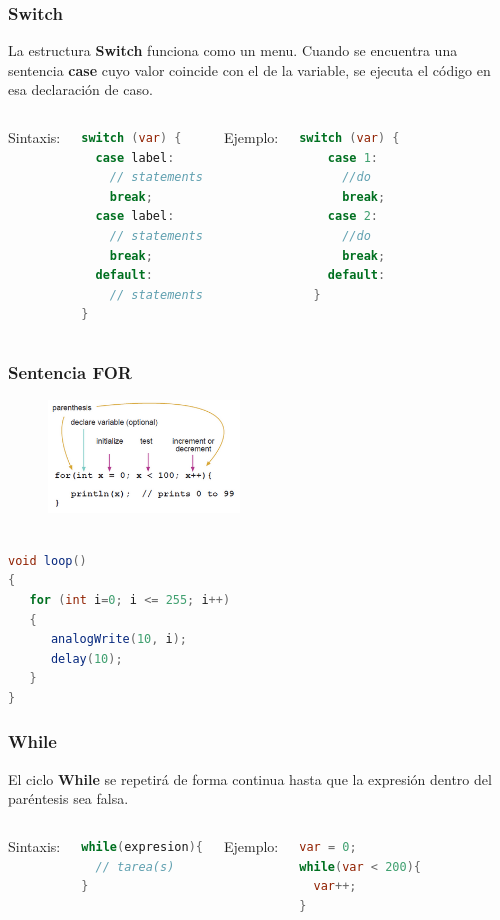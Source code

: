 \documentclass{beamer}
\begin{document}
\begin{frame}[fragile]
\frametitle{Switch}
La estructura \textbf{Switch} funciona como un menu. Cuando se encuentra una sentencia \textbf{case} cuyo valor coincide con el de la variable, se ejecuta el código en esa declaración de caso.
\vspace{0.1in}
\begin{columns}[c]
Sintaxis:\\
\begin{lstlisting}[language=java]
switch (var) {
  case label:
    // statements
    break;
  case label:
    // statements
    break;
  default: 
    // statements
}
\end{lstlisting}
Ejemplo:
\begin{lstlisting}[language=java]
switch (var) {
    case 1:
      //do
      break;
    case 2:
      //do
      break;
    default:
  }
\end{lstlisting}
\end{columns}
\end{frame}

\begin{frame}[fragile]
\frametitle{Sentencia FOR}
\begin{figure}[!h]
\centering
\includegraphics[width=2in]{for}
\end{figure}
\begin{lstlisting}[language=java]

void loop()
{
   for (int i=0; i <= 255; i++)
   {
      analogWrite(10, i);
      delay(10);
   } 
}
\end{lstlisting}
\end{frame}

\begin{frame}[fragile]
\frametitle{While}
El ciclo \textbf{While} se repetirá de forma continua hasta que la expresión dentro del paréntesis sea falsa.
\vspace{0.1in}
\begin{columns}[c]
Sintaxis:\\
\begin{lstlisting}[language=java]
while(expresion){
  // tarea(s)
}
\end{lstlisting}
Ejemplo:
\begin{lstlisting}[language=java]
var = 0;
while(var < 200){
  var++;
}
\end{lstlisting}
\end{columns}
\end{frame}
\end{document}
